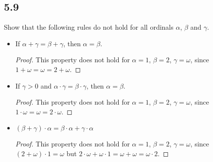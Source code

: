 \subsection*{5.9} Show that the following rules do not hold for all ordinals $\alpha$, $\beta$ and $\gamma$.

\begin{itemize}
    \item If $\alpha + \gamma = \beta + \gamma$, then $\alpha = \beta$.

    \begin{proof}
        This property does not hold for $\alpha = 1$, $\beta = 2$, $\gamma = \omega$, since $1 + \omega = \omega = 2 + \omega$.
    \end{proof}

    \item If $\gamma > 0$ and $\alpha \cdot \gamma = \beta \cdot \gamma$, then $\alpha = \beta$.

    \begin{proof}
        This property does not hold for $\alpha = 1$, $\beta = 2$, $\gamma = \omega$, since $1 \cdot \omega = \omega = 2 \cdot \omega$.
    \end{proof}

    \item $(\beta + \gamma) \cdot \alpha = \beta \cdot \alpha + \gamma \cdot \alpha$

    \begin{proof}
        This property does not hold for $\alpha = 1$, $\beta = 2$, $\gamma = \omega$, since $(2 + \omega) \cdot 1 = \omega$ but $2 \cdot \omega + \omega \cdot 1 = \omega + \omega = \omega \cdot 2$.
    \end{proof}
\end{itemize}

